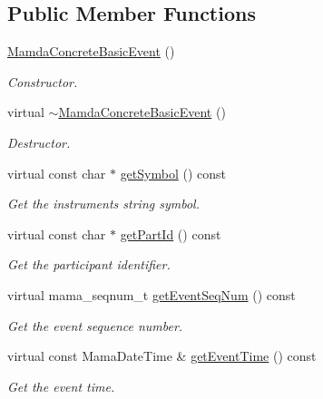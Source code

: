 \subsection*{Public Member Functions}
\begin{CompactItemize}
\item 
\hyperlink{classWombat_1_1MamdaConcreteBasicEvent_48b9267d79c340a4ed80e5f9b2b052b3}{Mamda\-Concrete\-Basic\-Event} ()
\begin{CompactList}\small\item\em Constructor. \item\end{CompactList}\item 
virtual \hyperlink{classWombat_1_1MamdaConcreteBasicEvent_048c2b90c35690af390252fa8569685c}{$\sim$Mamda\-Concrete\-Basic\-Event} ()
\begin{CompactList}\small\item\em Destructor. \item\end{CompactList}\item 
virtual const char $\ast$ \hyperlink{classWombat_1_1MamdaConcreteBasicEvent_780ca0833332b5807a30a886e05783a6}{get\-Symbol} () const 
\begin{CompactList}\small\item\em Get the instruments string symbol. \item\end{CompactList}\item 
virtual const char $\ast$ \hyperlink{classWombat_1_1MamdaConcreteBasicEvent_78269392b05726fb1a17ca054beffcdf}{get\-Part\-Id} () const 
\begin{CompactList}\small\item\em Get the participant identifier. \item\end{CompactList}\item 
virtual mama\_\-seqnum\_\-t \hyperlink{classWombat_1_1MamdaConcreteBasicEvent_f77bc954633096ff731212ed5b86c3a7}{get\-Event\-Seq\-Num} () const 
\begin{CompactList}\small\item\em Get the event sequence number. \item\end{CompactList}\item 
virtual const Mama\-Date\-Time \& \hyperlink{classWombat_1_1MamdaConcreteBasicEvent_887c69f7d9259d62ae323ddc3706ac44}{get\-Event\-Time} () const 
\begin{CompactList}\small\item\em Get the event time. \item\end{CompactList}\item 

\end{CompactItemize}
